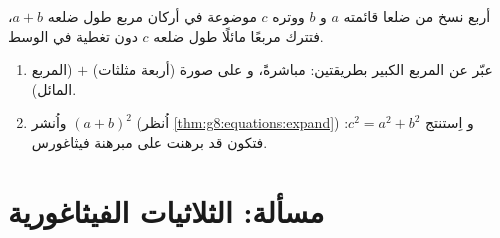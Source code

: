\begin{exercise}[$\star\star\star$]\label{exo:g8:pythagoras:11}
أربع نسخ من  ضلعا قائمته $a$ و $b$ ووتره $c$
موضوعة في أركان مربع طول ضلعه $a + b$، فتترك
مربعًا مائلًا طول ضلعه $c$ دون تغطية في الوسط.
\begin{enumerate}
  \item عبّر عن  المربع الكبير بطريقتين: مباشرةً، و
        على صورة (أربعة مثلثات) $+$ (المربع المائل).
  \item واُنشر $(a + b)^2$ (اُنظر \cref{thm:g8:equations:expand}) و
        اِستنتج $c^2 = a^2 + b^2$: فتكون قد برهنت على مبرهنة
        فيثاغورس.
\end{enumerate}
\end{exercise}

\section{مسألة: الثلاثيات الفيثاغورية}

